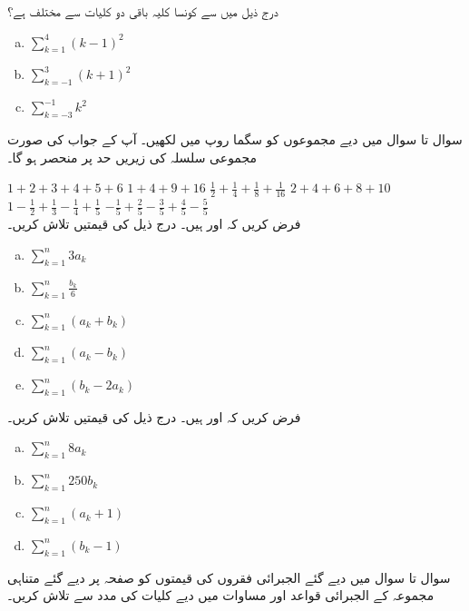 درج ذیل میں سے کونسا کلیہ باقی دو کلیات سے مختلف ہے؟
\begin{multicols}{3}
\begin{enumerate}[a.]
\item
$\sum\limits_{k=1}^4 (k-1)^2$
\item
$\sum\limits_{k=-1}^3 (k+1)^2$
\item
$\sum\limits_{k=-3}^{-1} k^2$
\end{enumerate}
\end{multicols}
سوال  تا سوال  میں دیے مجموعوں کو سگما روپ میں لکھیں۔ آپ کے جواب کی صورت مجموعی سلسلہ کی زیریں حد پر منحصر ہو گا۔ 

$1+2+3+4+5+6$
$1+4+9+16$
$\tfrac{1}{2}+\tfrac{1}{4}+\tfrac{1}{8}+\tfrac{1}{16}$
$2+4+6+8+10$
$1-\tfrac{1}{2}+\tfrac{1}{3}-\tfrac{1}{4}+\tfrac{1}{5}$
$-\tfrac{1}{5}+\tfrac{2}{5}-\tfrac{3}{5}+\tfrac{4}{5}-\tfrac{5}{5}$
\\
فرض کریں کہ  اور  ہیں۔ درج ذیل کی قیمتیں تلاش کریں۔
\begin{multicols}{3}
\begin{enumerate}[a.]
\item
$\sum\limits_{k=1}^n 3a_k$
\item
$\sum\limits_{k=1}^n\tfrac{b_k}{6}$
\item
$\sum\limits_{k=1}^n (a_k+b_k)$
\item
$\sum\limits_{k=1}^n(a_k-b_k)$
\item
$\sum\limits_{k=1}^n(b_k-2a_k)$
\end{enumerate}
\end{multicols}
فرض کریں کہ  اور  ہیں۔ درج ذیل کی قیمتیں تلاش کریں۔
\begin{multicols}{4}
\begin{enumerate}[a.]
\item
$\sum\limits_{k=1}^n 8a_k$
\item
$\sum\limits_{k=1}^n250b_k$
\item
$\sum\limits_{k=1}^n(a_k+1)$
\item
$\sum\limits_{k=1}^n(b_k-1)$
\end{enumerate}
\end{multicols}
سوال  تا سوال  میں دیے گئے الجبرائی فقروں کی قیمتوں کو صفحہ  پر دیے گئے متناہی مجموعہ کے  الجبرائی قواعد اور مساوات  میں دیے کلیات کی مدد سے تلاش کریں۔
 
